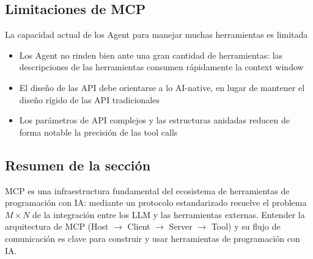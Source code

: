 \subsection{Limitaciones de MCP}

\begin{warningbox}{La capacidad actual de los Agent para manejar muchas herramientas es limitada}
\begin{itemize}
    \item Los Agent no rinden bien ante una gran cantidad de herramientas: las descripciones de las herramientas consumen rápidamente la context window
    \item El diseño de las API debe orientarse a lo AI-native, en lugar de mantener el diseño rígido de las API tradicionales
    \item Los parámetros de API complejos y las estructuras anidadas reducen de forma notable la precisión de las tool calls
\end{itemize}
\end{warningbox}

\subsection{Resumen de la sección}

MCP es una infraestructura fundamental del ecosistema de herramientas de programación con IA: mediante un protocolo estandarizado resuelve el problema $M \times N$ de la integración entre los LLM y las herramientas externas. Entender la arquitectura de MCP (Host $\rightarrow$ Client $\rightarrow$ Server $\rightarrow$ Tool) y su flujo de comunicación es clave para construir y usar herramientas de programación con IA.
